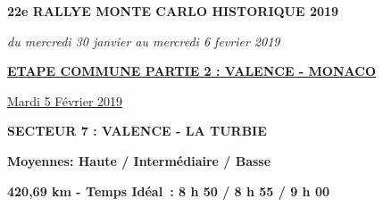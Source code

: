 \documentclass{article}%
\begin{document}
%
\normalsize%
\begin{center} \textbf{\LARGE{22e RALLYE MONTE CARLO HISTORIQUE 2019}} \end{center}%
\begin{center} \textit{du mercredi 30 janvier au mercredi 6 fevrier 2019} \end{center}%
\begin{center} \textbf{\underline{ETAPE COMMUNE PARTIE 2 : VALENCE - MONACO}} \end{center}%
\begin{flushright} \underline{Mardi 5 Février 2019
} \end{flushright}%
\begin{flushleft} \textbf{SECTEUR 7 : VALENCE - LA TURBIE
} \end{flushleft}%
\begin{flushright} \textbf{             Moyennes: Haute / Intermédiaire / Basse
} \end{flushright}%
\begin{flushright} \textbf{420,69 km - Temps Idéal : 8 h 50 / 8 h 55 / 9 h 00
} \end{flushright}%
\end{document}

